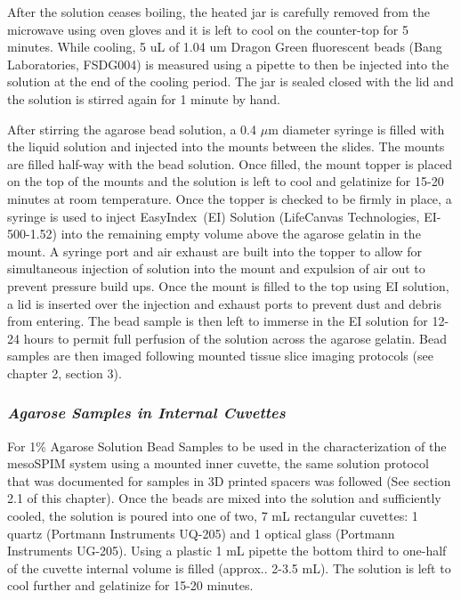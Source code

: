 After the solution ceases boiling, the heated jar is carefully removed from the microwave using oven gloves and it is left to cool on the counter-top for 5 minutes. While cooling, 5 uL of 1.04 um Dragon Green fluorescent beads (Bang Laboratories, FSDG004) is measured using a pipette to then be injected into the solution at the end of the cooling period. The jar is sealed closed with the lid and the solution is stirred again for 1 minute by hand. 

After stirring the agarose bead solution, a 0.4 $\mu$m diameter syringe is filled with the liquid solution and injected into the mounts between the slides. The mounts are filled half-way with the bead solution. Once filled, the mount topper is placed on the top of the mounts and the solution is left to cool and gelatinize for 15-20 minutes at room temperature. Once the topper is checked to be firmly in place, a syringe is used to inject EasyIndex\texttrademark\ (EI) Solution (LifeCanvas Technologies, EI-500-1.52) into the remaining empty volume above the agarose gelatin in the mount. A syringe port and air exhaust are built into the topper to allow for simultaneous injection of solution into the mount and expulsion of air out to prevent pressure build ups. Once the mount is filled to the top using EI solution, a lid is inserted over the injection and exhaust ports to prevent dust and debris from entering. The bead sample is then left to immerse in the EI solution for 12-24 hours to permit full perfusion of the solution across the agarose gelatin. Bead samples are then imaged following mounted tissue slice imaging protocols (see chapter 2, section 3).

\subsubsection{\textit{Agarose Samples in Internal Cuvettes}}

For 1\% Agarose Solution Bead Samples to be used in the characterization of the mesoSPIM system using a mounted inner cuvette, the same solution protocol that was documented for samples in 3D printed spacers was followed (See section 2.1 of this chapter). Once the beads are mixed into the solution and sufficiently cooled, the solution is poured into one of two, 7 mL rectangular cuvettes: 1 quartz (Portmann Instruments UQ-205) and 1 optical glass (Portmann Instruments UG-205). Using a plastic 1 mL pipette the bottom third to one-half of the cuvette internal volume is filled (approx.. 2-3.5 mL). The solution is left to cool further and gelatinize for 15-20 minutes. 

